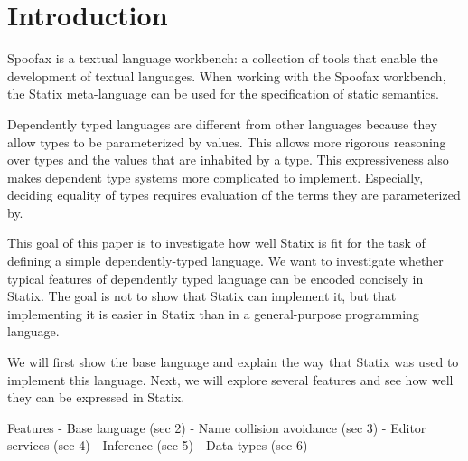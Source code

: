 \section{Introduction}
Spoofax is a textual language workbench: \label{key}a collection of tools that enable the development of textual languages. When working with the Spoofax workbench, the Statix meta-language can be used for the specification of static semantics. 

Dependently typed languages are different from other languages because they allow types to be parameterized by values. This allows more rigorous reasoning over types and the values that are inhabited by a type. This expressiveness also makes dependent type systems more complicated to implement. Especially, deciding equality of types requires evaluation of the terms they are parameterized by. 

This goal of this paper is to investigate how well Statix is fit for the task of defining a simple dependently-typed language. We want to investigate whether typical features of dependently typed language can be encoded concisely in Statix. The goal is not to show that Statix can implement it, but that implementing it is easier in Statix than in a general-purpose programming language. 

We will first show the base language and explain the way that Statix was used to implement this language. Next, we will explore several features and see how well they can be expressed in Statix. 

Features
- Base language (sec 2)
- Name collision avoidance (sec 3)
- Editor services (sec 4)
- Inference (sec 5)
- Data types (sec 6)
